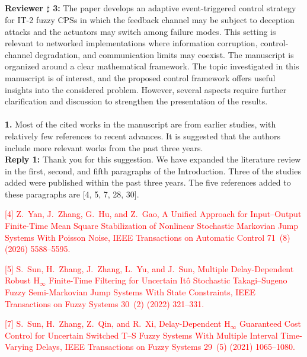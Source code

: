 \documentclass[10pt,fleqn]{article}
\begin{document}
~\\
\\
\makebox[\linewidth][l]{*****************************************************************************************}\\
\\
\hspace*{-0.5cm}\indent\textbf{Reviewer $\sharp$ 3:} The paper develops an adaptive event-triggered control strategy for IT-2 fuzzy CPSs in which the feedback channel may be subject to deception attacks and the actuators may switch among failure modes. This setting is relevant to networked implementations where information corruption, control-channel degradation, and communication limits may coexist. The manuscript is organized around a clear mathematical framework. The topic investigated in this manuscript is of interest, and the proposed control framework offers useful insights into the considered problem. However, several aspects require further clarification and discussion to strengthen the presentation of the results.
\\
~\\
\textbf{1.} Most of the cited works in the manuscript are from earlier studies, with relatively few references to recent advances. It is suggested that the authors include more relevant works from the past three years.
\\[10pt]
\begingroup
\setlength{\parskip}{6pt}
\indent \textbf{Reply 1:} Thank you for this suggestion. We have expanded the literature review in the first, second, and fifth paragraphs of the Introduction. Three of the studies added were published within the past three years. The five references added to these paragraphs are [4, 5, 7, 28, 30].\par
{ \textcolor{red}{[4] Z.~Yan, J.~Zhang, G.~Hu, and Z.~Gao, A {{Unified Approach}} for {{Input}}--{{Output Finite-Time Mean Square Stabilization}} of {{Nonlinear Stochastic Markovian Jump Systems With Poisson Noise}}, IEEE Transactions on Automatic Control 71~(8) (2026) 5588--5595.}\par}
{ \textcolor{red}{[5] S.~Sun, H.~Zhang, J.~Zhang, L.~Yu, and J.~Sun, Multiple {{Delay-Dependent Robust}} {$\mathrm{H}_\infty$} {{Finite-Time Filtering}} for {{Uncertain It\^o Stochastic Takagi}}--{{Sugeno Fuzzy Semi-Markovian Jump Systems With State Constraints}}, IEEE Transactions on Fuzzy Systems 30~(2) (2022) 321--331.}\par}
{ \textcolor{red}{[7] S.~Sun, H.~Zhang, Z.~Qin, and R.~Xi, Delay-{{Dependent}} {$\mathrm{H}_\infty$} {{Guaranteed Cost Control}} for {{Uncertain Switched T}}--{{S Fuzzy Systems With Multiple Interval Time-Varying Delays}}, IEEE Transactions on Fuzzy Systems 29~(5) (2021) 1065--1080.}\par}
\end{document}
